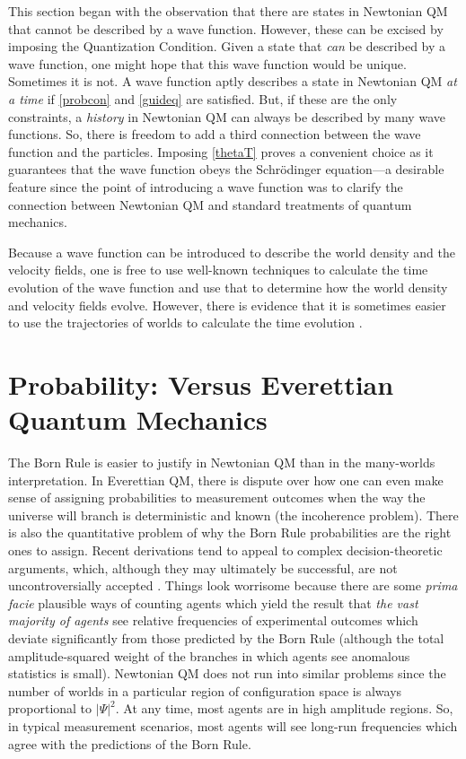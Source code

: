 \documentclass[onecolumn,secnumarabic,balancelastpage,amsmath,amssymb,nofootinbib]{article}
\begin{document}
This section began with the observation that there are states in Newtonian QM that cannot be described by a wave function.  However, these can be excised by imposing the Quantization Condition.  Given a state that \emph{can} be described by a wave function, one might hope that this wave function would be unique.  Sometimes it is not.  A wave function aptly describes a state in Newtonian QM \emph{at a time} if \eqref{probcon} and \eqref{guideq} are satisfied.  But, if these are the only constraints, a \emph{history} in Newtonian QM can always be described by many wave functions.  So, there is freedom to add a third connection between the wave function and the particles.  Imposing \eqref{thetaT} proves a convenient choice as it guarantees that the wave function obeys the Schr\"{o}dinger equation---a desirable feature since the point of introducing a wave function was to clarify the connection between Newtonian QM and standard treatments of quantum mechanics.

Because a wave function can be introduced to describe the world density and the velocity fields, one is free to use well-known techniques to calculate the time evolution of the wave function and use that to determine how the world density and velocity fields evolve.  However, there is evidence that it is sometimes easier to use the trajectories of worlds to calculate the time evolution \citep{wyatt2005, HDW}.

\section{Probability: Versus Everettian Quantum Mechanics}\label{probEQM}

The Born Rule is easier to justify in Newtonian QM than in the many-worlds interpretation.  In Everettian QM, there is dispute over how one can even make sense of assigning probabilities to measurement outcomes when the way the universe will branch is deterministic and known (the incoherence problem).  There is also the quantitative problem of why the Born Rule probabilities are the right ones to assign.  Recent derivations tend to appeal to complex decision-theoretic arguments, which, although they may ultimately be successful, are not uncontroversially accepted \citep{MWbook}.  Things look worrisome because there are some \emph{prima facie} plausible ways of counting agents which yield the result that \emph{the vast majority of agents} see relative frequencies of experimental outcomes which deviate significantly from those predicted by the Born Rule (although the total amplitude-squared weight of the branches in which agents see anomalous statistics is small).  Newtonian QM does not run into similar problems since the number of worlds in a particular region of configuration space is always proportional to $|\Psi|^2$.  At any time, most agents are in high amplitude regions.  So, in typical measurement scenarios, most agents will see long-run frequencies which agree with the predictions of the Born Rule.
\end{document}
